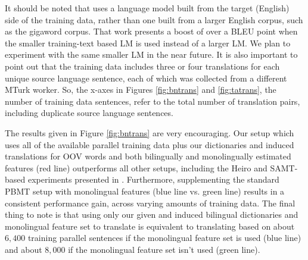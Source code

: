 \documentclass[11pt]{article}
\begin{document}
It should be noted that  uses a language model built from the target (English) side of the training data, rather than one built from a larger English corpus, such as the gigaword corpus. That work presents a boost of over a BLEU point when the smaller training-text based LM is used instead of a larger LM. We plan to experiment with the same smaller LM in the near future. It is also important to point out that the training data includes three or four translations for each unique source language sentence, each of which was collected from a different MTurk worker. So, the x-axes in Figures \ref{fig:bntrans} and \ref{fig:tatrans}, the number of training data sentences, refer to the total number of translation pairs, including duplicate source language sentences. 

The results given in Figure \ref{fig:bntrans} are very encouraging. Our setup which uses all of the available parallel training data plus our dictionaries and induced translations for OOV words and both bilingually and monolingually estimated features (red line) outperforms all other setups, including the Heiro and SAMT-based experiments presented in . Furthermore, supplementing the standard PBMT setup with monolingual features (blue line vs. green line) results in a consistent performance gain, across varying amounts of training data. The final thing to note is that using only our given and induced bilingual dictionaries and monolingual feature set to translate is equivalent to translating based on about $6,400$ training parallel sentences if the monolingual feature set is used (blue line) and about $8,000$ if the monolingual feature set isn't used (green line).
\end{document}
